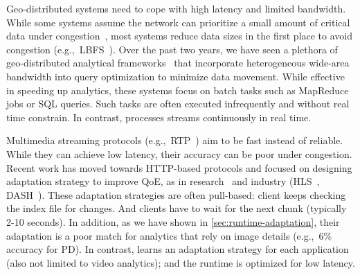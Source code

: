 \documentclass[thesis.tex]{subfiles}
\begin{document}
 Geo-distributed systems need to cope with high latency
and limited bandwidth. While some systems assume the network can prioritize a
small amount of critical data under congestion~\cite{cho2012surviving}, most
systems reduce data sizes in the first place to avoid congestion
(e.g.,~LBFS~\cite{muthitacharoen2001low}). Over the past two years, we have seen
a plethora of geo-distributed analytical
frameworks~\cite{vulimiri2015wananlytics, vulimiri2015global, pu2015low,
  kloudas2015pixida, viswanathan2016clarinet} that incorporate heterogeneous
wide-area bandwidth into query optimization to minimize data movement. While
effective in speeding up analytics, these systems focus on batch tasks such as
MapReduce jobs or SQL queries. Such tasks are often executed infrequently and
without real time constrain. In contrast, \sysname{} processes streams
continuously in real time.









 Multimedia streaming protocols
(e.g.,~RTP~\cite{schulzrinne2006rtp}) aim to be fast instead of reliable. While
they can achieve low latency, their accuracy can be poor under congestion.
Recent work has moved towards HTTP-based protocols and focused on designing
adaptation strategy to improve QoE, as in research~\cite{mao2017neural,
  sun2016cs2p, yin2015control} and industry (HLS~\cite{pantos2016http},
DASH~\cite{michalos2012dynamic, sodagar2011mpeg}). These adaptation strategies
are often pull-based: client keeps checking the index file for changes. And
clients have to wait for the next chunk (typically 2-10 seconds). In addition,
as we have shown in \autoref{sec:runtime-adaptation}, their adaptation is a poor
match for analytics that rely on image details (e.g.,~6\% accuracy for PD). In
contrast, \sysname{} learns an adaptation strategy for each application (also
not limited to video analytics); and the runtime is optimized for low latency.
\end{document}
